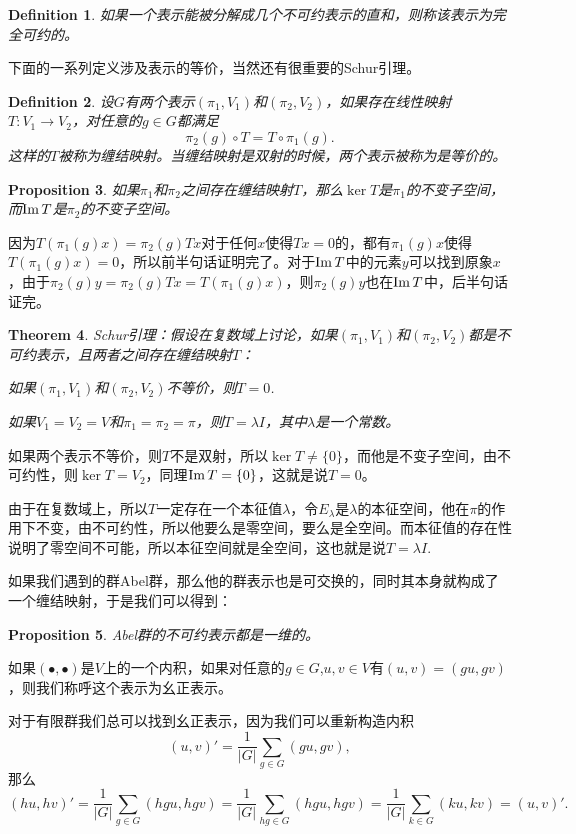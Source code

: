 \documentclass[9pt]{extbook}
\theoremstyle{plain}
\newtheorem{defi}{Definition}
\newtheorem{pro}[defi]{Proposition}
\newtheorem{theo}[defi]{Theorem}
\begin{document}
\begin{defi}
如果一个表示能被分解成几个不可约表示的直和，则称该表示为完全可约的。
\end{defi}
下面的一系列定义涉及表示的等价，当然还有很重要的Schur引理。
\begin{defi}
设$G$有两个表示$(\pi_1,V_1)$和$(\pi_2,V_2)$，如果存在线性映射$T:V_1\to V_2$，对任意的$g\in G$都满足
\[
\pi_2(g)\circ T=T\circ \pi_1(g).
\]
这样的$T$被称为缠结映射。当缠结映射是双射的时候，两个表示被称为是等价的。
\end{defi}
\begin{pro}
如果$\pi_1$和$\pi_2$之间存在缠结映射$T$，那么$\ker T$是$\pi_1$的不变子空间，而$\operatorname{Im} T$是$\pi_2$的不变子空间。
\end{pro}
因为$T(\pi_1(g)x)=\pi_2(g)Tx$对于任何$x$使得$Tx=0$的，都有$\pi_1(g)x$使得$T(\pi_1(g)x)=0$，所以前半句话证明完了。对于$\operatorname{Im} T$中的元素$y$可以找到原象$x$，由于$\pi_2(g)y=\pi_2(g)Tx=T(\pi_1(g)x)$，则$\pi_2(g)y$也在$\operatorname{Im} T$中，后半句话证完。
\begin{theo}
Schur引理：假设在复数域上讨论，如果$(\pi_1,V_1)$和$(\pi_2,V_2)$都是不可约表示，且两者之间存在缠结映射$T$：

 如果$(\pi_1,V_1)$和$(\pi_2,V_2)$不等价，则$T=0$.

 如果$V_1=V_2=V$和$\pi_1=\pi_2=\pi$，则$T=\lambda I$，其中$\lambda$是一个常数。
\end{theo}

如果两个表示不等价，则$T$不是双射，所以$\ker T\neq \{0\}$，而他是不变子空间，由不可约性，则$\ker T= V_2$，同理$\operatorname{Im}  T= \{0\}$，这就是说$T=0$。

由于在复数域上，所以$T$一定存在一个本征值$\lambda$，令$E_\lambda$是$\lambda$的本征空间，他在$\pi$的作用下不变，由不可约性，所以他要么是零空间，要么是全空间。而本征值的存在性说明了零空间不可能，所以本征空间就是全空间，这也就是说$T=\lambda I$.

如果我们遇到的群Abel群，那么他的群表示也是可交换的，同时其本身就构成了一个缠结映射，于是我们可以得到：
\begin{pro}
	Abel群的不可约表示都是一维的。
\end{pro}
如果$(\bullet,\bullet)$是$V$上的一个内积，如果对任意的$g\in G$,$u,v\in V$有$(u,v)=(gu,gv)$，则我们称呼这个表示为幺正表示。

对于有限群我们总可以找到幺正表示，因为我们可以重新构造内积
\[
(u,v)'=\frac{1}{|G|}\sum_{g\in G}(gu,gv),
\]
那么
\[
(hu,hv)'=\frac{1}{|G|}\sum_{g\in G}(hgu,hgv)=\frac{1}{|G|}\sum_{hg\in G}(hgu,hgv)=\frac{1}{|G|}\sum_{k\in G}(ku,kv)=(u,v)'.
\]
\end{document}
